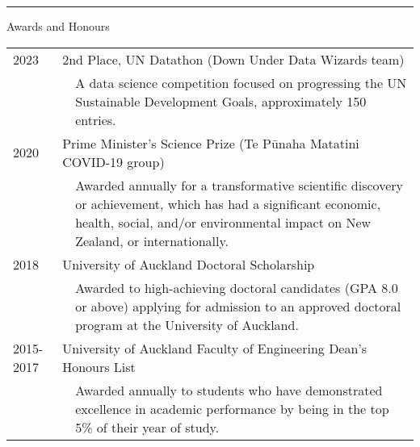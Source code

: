 \documentclass[paper=a4paper,fontsize=11pt]{scrartcl}
\newcommand{\pagerule}[1][2pt]{\noindent\rule{\textwidth}{#1}}
\newcommand{\usingfont}[2]{#1 #2 \par \normalsize \normalfont}
\newcommand{\sectionheader}[1]{\pagerule \vspace{0.05ex} \usingfont{\usefont{T1}{phv}{m}{v} \Large}{\noindent \hspace{-0.5em} #1} \vspace{0.75ex}}
\newlength{\spacebox}
\begin{document}
\sectionheader{Awards and Honours}
\vspace{0.5ex}\noindent
\begin{tabular}{p{1.0\spacebox} p{0.2\spacebox} p{6.5\spacebox}}
2023 & \multicolumn{2}{l}{2nd Place, UN Datathon (Down Under Data
Wizards team)} \\
& & \small{A data science competition focused on progressing the UN
Sustainable Development Goals, approximately 150 entries.}\normalsize\\ 
2020 & \multicolumn{2}{l}{Prime Minister's Science Prize (Te Pūnaha
Matatini COVID-19 group)} \\
& & \small{Awarded annually for a transformative scientific discovery or
achievement, which has had a significant economic, health, social,
and/or environmental impact on New Zealand, or
internationally.}\normalsize\\ 
2018 & \multicolumn{2}{l}{University of Auckland Doctoral
Scholarship} \\
& & \small{Awarded to high-achieving doctoral candidates (GPA 8.0 or
above) applying for admission to an approved doctoral program at the
University of Auckland.}\normalsize\\ 
2015-2017 & \multicolumn{2}{l}{University of Auckland Faculty of
Engineering Dean's Honours List} \\
& & \small{Awarded annually to students who have demonstrated excellence
in academic performance by being in the top 5\% of their year of
study.}\normalsize\\ 
\end{tabular}
\end{document}
